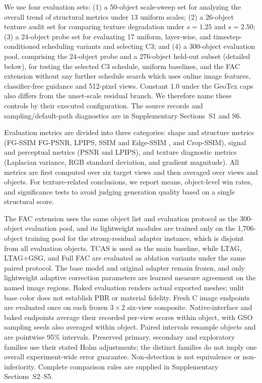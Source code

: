 \documentclass[times,twocolumn,final]{elsarticle}
\providecommand{\DIFadd}[1]{{\protect\color{blue} \sf #1}} %
\providecommand{\DIFdel}[1]{{\protect\color{red} \scriptsize #1}} %
\providecommand{\DIFaddbegin}{} %
\providecommand{\DIFaddend}{} %
\providecommand{\DIFdelbegin}{} %
\providecommand{\DIFdelend}{} %
\begin{document}
\DIFdel{We use four evaluation sets: (1) a 50-object scale-sweep set for analyzing the overall trend of structural metrics under 13 uniform scales; (2) a 26-object texture audit set for comparing texture degradation under $s = 1.25$ and $s = 2.50$; (3) a 24-object probe set for evaluating 17 uniform, layer-wise, and timestep-conditioned scheduling variants and selecting C3; and (4) a 300-object evaluation pool, comprising the 24-object probe and a 276-object held-out subset (detailed below), for testing the selected C3 schedule, uniform baselines, and the FAC extension without any further schedule search}\DIFdelend \DIFaddbegin \DIFadd{which uses online image features, classifier-free guidance and 512-pixel views. Constant 1.0 under the GeoTex caps also differs from the unset-scale residual branch. We therefore name these controls by their executed configuration. The source records and sampling/default-path diagnostics are in Supplementary Sections~S1 and S6}\DIFaddend .

\DIFdelbegin \DIFdel{Evaluation metrics are divided into three categories: shape and structure metrics (FG-SSIM}\DIFdelend \DIFaddbegin \DIFadd{FG-PSNR, LPIPS}\DIFaddend , \DIFaddbegin \DIFadd{SSIM and }\DIFaddend Edge-SSIM \DIFdelbegin \DIFdel{, and Crop-SSIM), signal and perceptual metrics (PSNR and LPIPS), and texture diagnostic metrics (Laplacian variance, RGB standard deviation, and gradient magnitude). All metrics are first computed over six target views and then averaged over views and objects. For texture-related conclusions, we report means, object-level win rates, and significance tests to avoid judging generation quality based on a single structural score. }%

\DIFdel{The FAC extension uses the same object list and evaluation protocol as the 300-object evaluation pool, and its lightweight modules are trained only on the 1,706-object training pool for the strong-residual adapter instance, which is disjoint from all evaluation objects. TCAS is used as the main baseline, while LTAG, LTAG+GSG, and Full FAC are evaluated as ablation variants under the same paired protocol. The base model and original adapter remain frozen, and only lightweight adaptive correction parameters are learned}\DIFdelend \DIFaddbegin \DIFadd{measure agreement on the named image regions. Baked evaluation renders actual exported meshes; unlit base color does not establish PBR or material fidelity. Fresh C image endpoints are evaluated once on each frozen $3\times2$ six-view composite. Native-interface and baked endpoints average their recorded per-view scores within object, with GSO sampling seeds also averaged within object. Paired intervals resample objects and are pointwise 95\% intervals. Preserved primary, secondary and exploratory families use their stated Holm adjustments; the distinct families do not imply one overall experiment-wide error guarantee. Non-detection is not equivalence or non-inferiority. Complete comparison rules are supplied in Supplementary Sections~S2--S5}\DIFaddend .
\end{document}
